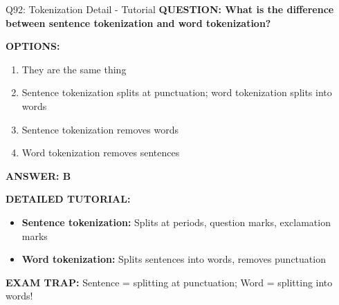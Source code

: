 \documentclass[8pt]{beamer}
\begin{document}
	\begin{frame}{Q92: Tokenization Detail - Tutorial}
		\fontsize{6.5}{7.5}\selectfont
		\textbf{QUESTION: What is the difference between sentence tokenization and word tokenization?}
		
		\vspace{0.1cm}
		\textbf{OPTIONS:}
		\begin{enumerate}
			\item They are the same thing
			\item Sentence tokenization splits at punctuation; word tokenization splits into words
			\item Sentence tokenization removes words
			\item Word tokenization removes sentences
		\end{enumerate}
		
		\vspace{0.1cm}
		\textcolor{myblue}{\textbf{ANSWER: B}}
		
		\vspace{0.1cm}
		\textbf{DETAILED TUTORIAL:}
		\begin{itemize}
			\item \textbf{Sentence tokenization:} Splits at periods, question marks, exclamation marks
			\item \textbf{Word tokenization:} Splits sentences into words, removes punctuation
		\end{itemize}
		
		\textcolor{myred}{\textbf{EXAM TRAP:}} Sentence = \textcolor{myblue}{splitting at punctuation}; Word = \textcolor{myblue}{splitting into words}!
	\end{frame}
	
\end{document}
